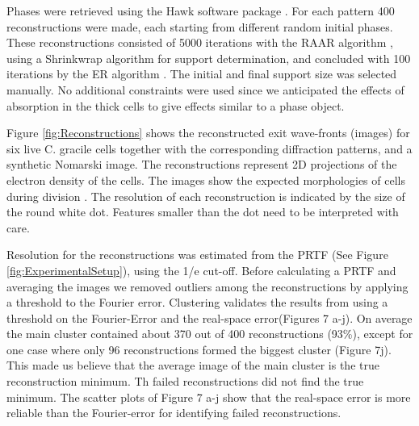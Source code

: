 Phases were retrieved using the Hawk software package \cite{Maia2010}. For each pattern 400 reconstructions were made, each starting from different random initial phases. These reconstructions consisted of 5000 iterations with the RAAR algorithm \cite{Luke2005}, using a Shrinkwrap algorithm \cite{} for support determination, and concluded with 100 iterations by the ER algorithm \cite{Fienup1978, Fienup1982}. The initial and final support size was selected manually. No additional constraints were used since we anticipated the effects of absorption in the thick cells to give effects similar to a phase object. 

Figure \ref{fig:Reconstructions} shows the reconstructed exit wave-fronts (images) for six live C. gracile cells together with the corresponding diffraction patterns, and a synthetic Nomarski image. The reconstructions represent 2D projections of the electron density of the cells. The images show the expected morphologies of cells during division \cite{Komarek1999,Bazire1988}. The resolution of each  reconstruction is indicated by the size of the round white dot. Features smaller than the dot need to be interpreted with care.

Resolution for the reconstructions was estimated from the PRTF (See Figure \ref{fig:ExperimentalSetup}), using the 1/e cut-off. Before calculating a PRTF and averaging the images we removed outliers among the reconstructions by applying a threshold to the Fourier error. Clustering validates the results from using a threshold on the Fourier-Error and the real-space error(Figures 7 a-j). On average the main cluster contained about 370 out of 400 reconstructions (93\%), except for one case where only 96 reconstructions formed the biggest cluster (Figure 7j). This made us believe that the average image of the main cluster is the true reconstruction minimum. Th failed reconstructions did not find the true minimum.
The scatter plots of Figure 7 a-j show that the real-space error is more reliable than the Fourier-error for identifying failed reconstructions.

